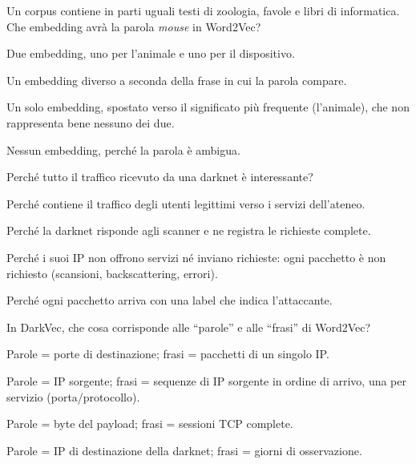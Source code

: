 \begin{domanda}\label{quiz:m48}
Un corpus contiene in parti uguali testi di zoologia, favole e libri di informatica. Che embedding avrà la parola \emph{mouse} in Word2Vec?
\begin{opzioni}
  \item Due embedding, uno per l'animale e uno per il dispositivo.
  \item Un embedding diverso a seconda della frase in cui la parola compare.
  \item Un solo embedding, spostato verso il significato più frequente (l'animale), che non rappresenta bene nessuno dei due.
  \item Nessun embedding, perché la parola è ambigua.
\end{opzioni}
\end{domanda}

\begin{domanda}[darknet]\label{quiz:m49}
Perché tutto il traffico ricevuto da una darknet è interessante?
\begin{opzioni}
  \item Perché contiene il traffico degli utenti legittimi verso i servizi dell'ateneo.
  \item Perché la darknet risponde agli scanner e ne registra le richieste complete.
  \item Perché i suoi IP non offrono servizi né inviano richieste: ogni pacchetto è non richiesto (scansioni, backscattering, errori).
  \item Perché ogni pacchetto arriva con una label che indica l'attaccante.
\end{opzioni}
\end{domanda}

\begin{domanda}[DarkVec]\label{quiz:m50}
In DarkVec, che cosa corrisponde alle ``parole'' e alle ``frasi'' di Word2Vec?
\begin{opzioni}
  \item Parole = porte di destinazione; frasi = pacchetti di un singolo IP.
  \item Parole = IP sorgente; frasi = sequenze di IP sorgente in ordine di arrivo, una per servizio (porta/protocollo).
  \item Parole = byte del payload; frasi = sessioni TCP complete.
  \item Parole = IP di destinazione della darknet; frasi = giorni di osservazione.
\end{opzioni}
\end{domanda}

